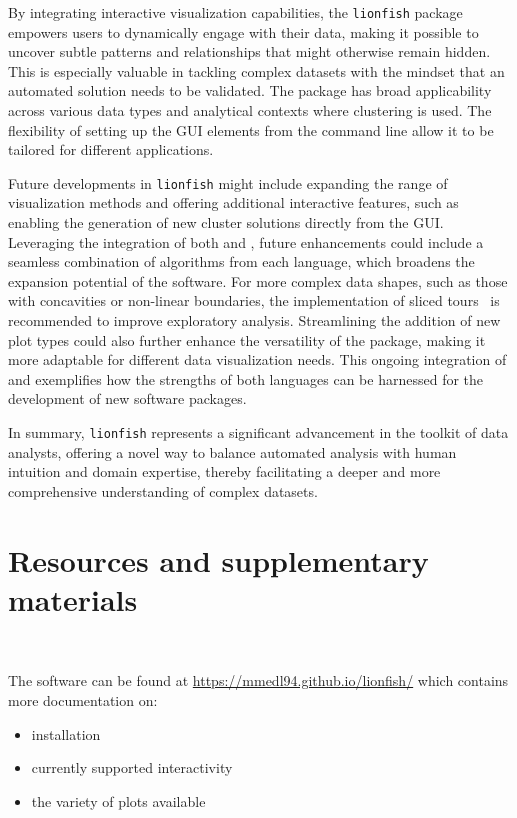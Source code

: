 \documentclass[article]{ajs}
\begin{document}
By integrating interactive visualization capabilities, the \texttt{lionfish} package empowers users to dynamically engage with their data, making it possible to uncover subtle patterns and relationships that might otherwise remain hidden. This is especially valuable in tackling complex datasets with the mindset that an automated solution needs to be validated. The package has broad applicability across various data types and analytical contexts where clustering is used. The flexibility of setting up the GUI elements from the command line allow it to be tailored for different applications.


Future developments in \texttt{lionfish} might include expanding the range of visualization methods and offering additional interactive features, such as enabling the generation of new cluster solutions directly from the GUI. Leveraging the integration of both  and , future enhancements could include a seamless combination of algorithms from each language, which broadens the expansion potential of the software. For more complex data shapes, such as those with concavities or non-linear boundaries, the implementation of sliced tours~\citep{Laa2020} is recommended to improve exploratory analysis. Streamlining the addition of new plot types could also further enhance the versatility of the package, making it more adaptable for different data visualization needs. This ongoing integration of  and  exemplifies how the strengths of both languages can be harnessed for the development of new software packages.

In summary, \texttt{lionfish} represents a significant advancement in the toolkit of data analysts, offering a novel way to balance automated analysis with human intuition and domain expertise, thereby facilitating a deeper and more comprehensive understanding of complex datasets.

\section{Resources and supplementary materials}~\label{resources}

The software can be found at  \href{https://mmedl94.github.io/lionfish/}{https://mmedl94.github.io/lionfish/} which contains more documentation on:

\begin{itemize} \itemsep 0in
\item installation
\item currently supported interactivity
\item the variety of plots available
\end{itemize}
\end{document}
